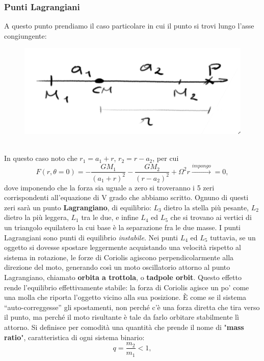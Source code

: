 \subsubsection{Punti Lagrangiani}
A questo punto prendiamo il caso particolare in cui il punto si trovi lungo l'asse congiungente:
\begin{figure}[h!]
    \centering
    \includegraphics[width=0.5\linewidth]{Immagini/potenziale di Roche lungo asse congiungente.png}
    \label{fig: Potenziale di Roche lungo congiungente}
\end{figure}\\
In questo caso noto che $r_1 = a_1 + r$, $r_2 = r - a_2$, per cui
\begin{equation}
    F(r, \theta=0)= -\frac{GM_1}{(a_1+r)^2} - \frac{GM_2}{(r-a_2)^2} + \Omega^2r \xrightarrow{impongo}=0,
\end{equation}
dove imponendo che la forza sia uguale a zero si troveranno i 5 zeri corrispondenti all'equazione di V grado che abbiamo scritto.
Ognuno di questi zeri sarà un punto \textbf{Lagrangiano}, di equilibrio:
$L_3$ dietro la stella più pesante, $L_2$ dietro la più leggera, $L_1$ tra le due, e infine $L_4$ ed $L_5$ che si trovano ai vertici di un triangolo equilatero la cui base è la separazione fra le due masse.
I punti Lagrangiani sono punti di equilibrio \textit{instabile}.
Nei punti $L_4$ ed $L_5$ tuttavia, se un oggetto si dovesse spostare leggermente acquistando una velocità rispetto al sistema in rotazione, le forze di Coriolis agiscono perpendicolarmente alla direzione del moto, generando così un moto oscillatorio attorno al punto Lagrangiano, chiamato \textbf{orbita a trottola}, o \textbf{tadpole orbit}.
Questo effetto rende l'equilibrio effettivamente stabile: la forza di Coriolis agisce un po' come una molla che riporta l'oggetto vicino alla sua posizione.
È come se il sistema “auto-correggesse” gli spostamenti, non perché c'è una forza diretta che tira verso il punto, ma perché il moto risultante è tale da farlo orbitare stabilmente lì attorno.
Si definisce per comodità una quantità che prende il nome di "\textbf{mass ratio}", caratteristica di ogni sistema binario:
\begin{equation}
    q = \frac{m_2}{m_1}<1,
\end{equation}
